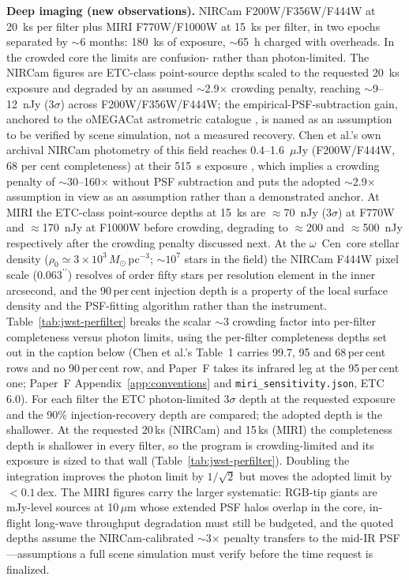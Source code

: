 \documentclass[11pt]{article}
\newcommand{\msun}{\ensuremath{M_\odot}}
\newcommand{\ocen}{\ensuremath{\omega}~Cen}
\begin{document}
\textbf{Deep imaging (new observations).} NIRCam F200W/F356W/F444W at 20~ks per filter plus MIRI F770W/F1000W at 15~ks per filter, in two epochs separated by $\sim$6 months: 180~ks of exposure, $\sim$65~h charged with overheads. In the crowded core the limits are confusion- rather than photon-limited. The NIRCam figures are ETC-class point-source depths scaled to the requested 20~ks exposure and degraded by an assumed $\sim$2.9$\times$ crowding penalty, reaching $\sim$9--12~nJy ($3\sigma$) across F200W/F356W/F444W; the empirical-PSF-subtraction gain, anchored to the oMEGACat astrometric catalogue \citep{Haberle2024oMEGACatII,Nitschai2023}, is named as an assumption to be verified by scene simulation, not a measured recovery. Chen et al.'s own archival NIRCam photometry of this field reaches 0.4--1.6~$\mu$Jy (F200W/F444W, 68 per cent completeness) at their 515~s exposure \citep{Chen2025JWST}, which implies a crowding penalty of $\sim$30--160$\times$ without PSF subtraction and puts the adopted $\sim$2.9$\times$ assumption in view as an assumption rather than a demonstrated anchor. At MIRI the ETC-class point-source depths at 15~ks are $\approx$70~nJy ($3\sigma$) at F770W and $\approx$170~nJy at F1000W before crowding, degrading to $\approx$200 and $\approx$500~nJy respectively after the crowding penalty discussed next. At the \ocen\ core stellar density ($\rho_{0} \simeq 3\times10^{3}$\,\msun\,pc$^{-3}$; $\sim$$10^{7}$ stars in the field) the NIRCam F444W pixel scale ($0.063^{\prime\prime}$) resolves of order fifty stars per resolution element in the inner arcsecond, and the 90\,per\,cent injection depth is a property of the local surface density and the PSF-fitting algorithm rather than the instrument. Table~\ref{tab:jwst-perfilter} breaks the scalar $\sim$3 crowding factor into per-filter completeness versus photon limits, using the per-filter completeness depths set out in the caption below (Chen et al.'s Table~1 carries 99.7, 95 and 68\,per\,cent rows and no 90\,per\,cent row, and Paper~F takes its infrared leg at the 95\,per\,cent one; Paper~F Appendix~\ref{app:conventions} and \texttt{miri\_sensitivity.json}, ETC\,6.0). For each filter the ETC photon-limited 3$\sigma$ depth at the requested exposure and the 90\% injection-recovery depth are compared; the adopted depth is the shallower. At the requested 20\,ks (NIRCam) and 15\,ks (MIRI) the completeness depth is shallower in every filter, so the program is crowding-limited and its exposure is sized to that wall (Table~\ref{tab:jwst-perfilter}). Doubling the integration improves the photon limit by $1/\sqrt2$ but moves the adopted limit by ${<}0.1$\,dex. The MIRI figures carry the larger systematic: RGB-tip giants are mJy-level sources at 10\,$\mu$m whose extended PSF halos overlap in the core, in-flight long-wave throughput degradation must still be budgeted, and the quoted depths assume the NIRCam-calibrated $\sim$3$\times$ penalty transfers to the mid-IR PSF---assumptions a full scene simulation must verify before the time request is finalized.
\end{document}
